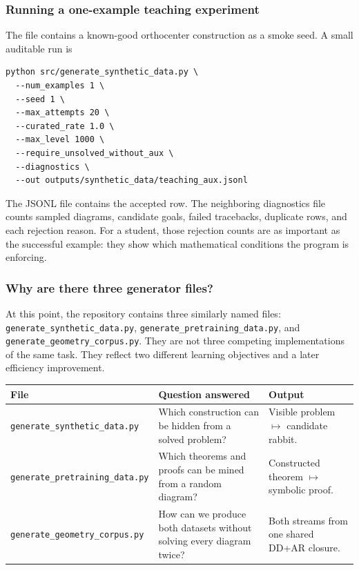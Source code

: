 \documentclass[reqno]{amsart}
\DeclareMathOperator{\1}{\textbf{1}}
\begin{document}
\subsubsection{Running a one-example teaching experiment}

The file contains a known-good orthocenter construction as a smoke seed. A
small auditable run is
\begin{lstlisting}
python src/generate_synthetic_data.py \
  --num_examples 1 \
  --seed 1 \
  --max_attempts 20 \
  --curated_rate 1.0 \
  --max_level 1000 \
  --require_unsolved_without_aux \
  --diagnostics \
  --out outputs/synthetic_data/teaching_aux.jsonl
\end{lstlisting}
The JSONL file contains the accepted row. The neighboring diagnostics file
counts sampled diagrams, candidate goals, failed tracebacks, duplicate rows,
and each rejection reason. For a student, those rejection counts are as
important as the successful example: they show which mathematical conditions
the program is enforcing.

\subsubsection{Why are there three generator files?}

At this point, the repository contains three similarly named files:
\verb|generate_synthetic_data.py|, \verb|generate_pretraining_data.py|, and
\verb|generate_geometry_corpus.py|. They are not three competing
implementations of the same task. They reflect two different learning
objectives and a later efficiency improvement.

\begin{center}
\begin{tabular}{p{}p{}p{}}
\textbf{File} & \textbf{Question answered} & \textbf{Output} \\
\hline
\texttt{generate\_synthetic\_data.py} & Which construction can be hidden from
a solved problem? & Visible problem $\mapsto$ candidate rabbit. \\
\texttt{generate\_pretraining\_data.py} & Which theorems and proofs can be
mined from a random diagram? & Constructed theorem $\mapsto$ symbolic proof. \\
\texttt{generate\_geometry\_corpus.py} & How can we produce both datasets
without solving every diagram twice? & Both streams from one shared DD+AR
closure. \\
\end{tabular}
\end{center}
\end{document}
